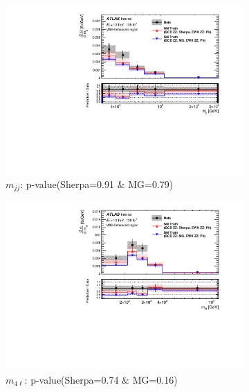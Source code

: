 \begin{figure}[!htb]
    \centering
    \begin{subfigure}{.48\textwidth}
        \centering
        \includegraphics[width=.98\linewidth]{figures/Results/CrossSection_VBSEnhanced/xs_mjj_SR.pdf}
        \caption{ \footnotesize{$m_{jj}$: p-value(Sherpa=0.91 $\&$ MG=0.79)}}
    \end{subfigure}
    \begin{subfigure}{.48\textwidth}
        \centering
        \includegraphics[width=.98\linewidth]{figures/Results/CrossSection_VBSEnhanced/xs_m4l_SR.pdf}
        \caption{ \footnotesize{$m_{4\ell}$: p-value(Sherpa=0.74 $\&$ MG=0.16)} }
    \end{subfigure}\\
    \begin{subfigure}{.48\textwidth}

\end{subfigure}
\end{figure}
